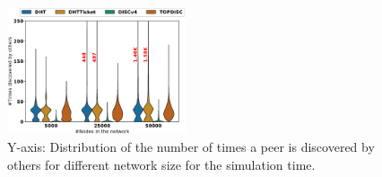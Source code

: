 \begin{figure}[!h]
\includegraphics[width=0.470\textwidth]{results/no_split/violin_size_wasDiscovered.eps}
\caption{Y-axis: Distribution of the number of times a peer is discovered by others for different network size for the simulation time.}
\label{fig:efficiency_size}
\end{figure}
\fi 
%
%
%
%
%

